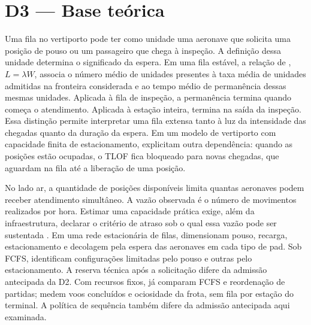 \section{D3 — Base teórica}

Uma fila no vertiporto pode ter como unidade uma aeronave que solicita uma posição de pouso ou um passageiro que chega à inspeção. A definição dessa unidade determina o significado da espera. Em uma fila estável, a relação de \citet{little1961}, $L=\lambda W$, associa o número médio de unidades presentes à taxa média de unidades admitidas na fronteira considerada e ao tempo médio de permanência dessas mesmas unidades. Aplicada à fila de inspeção, a permanência termina quando começa o atendimento. Aplicada à estação inteira, termina na saída da inspeção. Essa distinção permite interpretar uma fila extensa tanto à luz da intensidade das chegadas quanto da duração da espera. Em um modelo de vertiporto com capacidade finita de estacionamento, \citet{onat2026buffer} explicitam outra dependência: quando as posições estão ocupadas, o TLOF fica bloqueado para novas chegadas, que aguardam na fila até a liberação de uma posição.

No lado ar, a quantidade de posições disponíveis limita quantas aeronaves podem receber atendimento simultâneo. A vazão observada é o número de movimentos realizados por hora. Estimar uma capacidade prática exige, além da infraestrutura, declarar o critério de atraso sob o qual essa vazão pode ser sustentada \citep{zhang2023capacity,preisHornung2022heuristic}. Em uma rede estacionária de filas, \citet{escribanoMacias2023} dimensionam pouso, recarga, estacionamento e decolagem pela espera das aeronaves em cada tipo de pad. Sob FCFS, \citet{guerreiro2020} identificam configurações limitadas pelo pouso e outras pelo estacionamento. A reserva técnica após a solicitação difere da admissão antecipada da D2. Com recursos fixos, \citet{halderGandhi2025} já comparam FCFS e reordenação de partidas; medem voos concluídos e ociosidade da frota, sem fila por estação do terminal. A política de sequência também difere da admissão antecipada aqui examinada.


